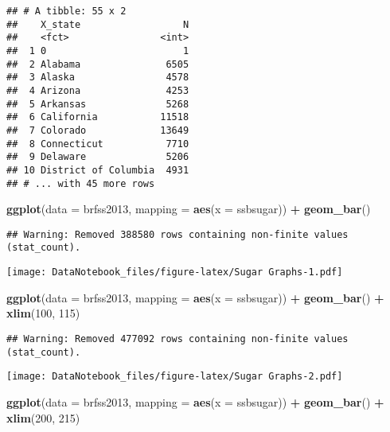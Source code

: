 \documentclass[]{article}
\newenvironment{Shaded}{\begin{snugshade}}{\end{snugshade}}
\newcommand{\KeywordTok}[1]{\textcolor[rgb]{0.13,0.29,0.53}{\textbf{#1}}}
\newcommand{\DataTypeTok}[1]{\textcolor[rgb]{0.13,0.29,0.53}{#1}}
\newcommand{\DecValTok}[1]{\textcolor[rgb]{0.00,0.00,0.81}{#1}}
\newcommand{\StringTok}[1]{\textcolor[rgb]{0.31,0.60,0.02}{#1}}
\newcommand{\OperatorTok}[1]{\textcolor[rgb]{0.81,0.36,0.00}{\textbf{#1}}}
\newcommand{\NormalTok}[1]{#1}
\begin{document}
\begin{verbatim}
## # A tibble: 55 x 2
##    X_state                  N
##    <fct>                <int>
##  1 0                        1
##  2 Alabama               6505
##  3 Alaska                4578
##  4 Arizona               4253
##  5 Arkansas              5268
##  6 California           11518
##  7 Colorado             13649
##  8 Connecticut           7710
##  9 Delaware              5206
## 10 District of Columbia  4931
## # ... with 45 more rows
\end{verbatim}

\begin{Shaded}
\begin{Highlighting}[]
\KeywordTok{ggplot}\NormalTok{(}\DataTypeTok{data =}\NormalTok{ brfss2013, }\DataTypeTok{mapping =} \KeywordTok{aes}\NormalTok{(}\DataTypeTok{x =}\NormalTok{ ssbsugar)) }\OperatorTok{+}\StringTok{ }\KeywordTok{geom_bar}\NormalTok{()}
\end{Highlighting}
\end{Shaded}

\begin{verbatim}
## Warning: Removed 388580 rows containing non-finite values (stat_count).
\end{verbatim}

\texttt{[image: DataNotebook\_files/figure-latex/Sugar Graphs-1.pdf]}

\begin{Shaded}
\begin{Highlighting}[]
\KeywordTok{ggplot}\NormalTok{(}\DataTypeTok{data =}\NormalTok{ brfss2013, }\DataTypeTok{mapping =} \KeywordTok{aes}\NormalTok{(}\DataTypeTok{x =}\NormalTok{ ssbsugar)) }\OperatorTok{+}\StringTok{ }\KeywordTok{geom_bar}\NormalTok{() }\OperatorTok{+}\StringTok{ }\KeywordTok{xlim}\NormalTok{(}\DecValTok{100}\NormalTok{, }\DecValTok{115}\NormalTok{)}
\end{Highlighting}
\end{Shaded}

\begin{verbatim}
## Warning: Removed 477092 rows containing non-finite values (stat_count).
\end{verbatim}

\texttt{[image: DataNotebook\_files/figure-latex/Sugar Graphs-2.pdf]}

\begin{Shaded}
\begin{Highlighting}[]
\KeywordTok{ggplot}\NormalTok{(}\DataTypeTok{data =}\NormalTok{ brfss2013, }\DataTypeTok{mapping =} \KeywordTok{aes}\NormalTok{(}\DataTypeTok{x =}\NormalTok{ ssbsugar)) }\OperatorTok{+}\StringTok{ }\KeywordTok{geom_bar}\NormalTok{() }\OperatorTok{+}\StringTok{ }\KeywordTok{xlim}\NormalTok{(}\DecValTok{200}\NormalTok{, }\DecValTok{215}\NormalTok{)}
\end{Highlighting}
\end{Shaded}
\end{document}
